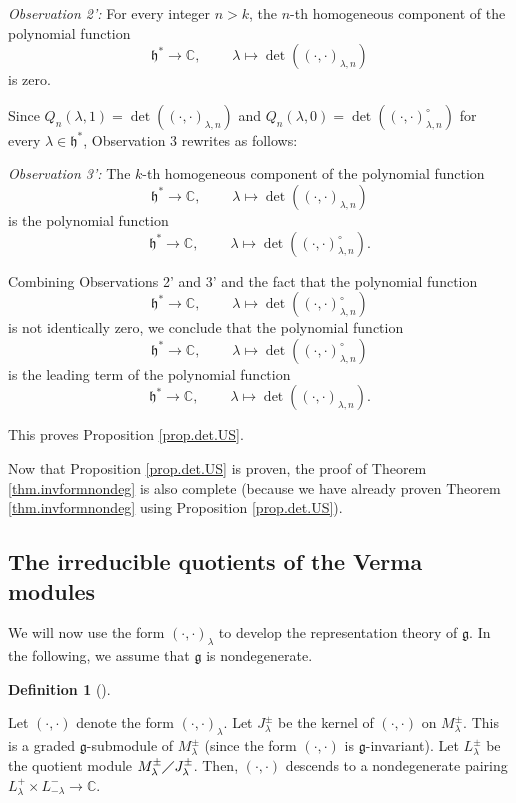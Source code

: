 \documentclass
[numbers=enddot,12pt,final,onecolumn,german,notitlepage]{scrartcl}%
\theoremstyle{definition}
\newtheorem{defi}[theo]{Definition}
\newenvironment{definition}[1][]
{\begin{defi}[#1]\begin{leftbar}}
{\end{leftbar}\end{defi}}
\begin{document}
\textit{Observation 2':} For every integer $n>k$, the $n$-th homogeneous
component of the polynomial function%
\[
\mathfrak{h}^{\ast}\rightarrow\mathbb{C},\ \ \ \ \ \ \ \ \ \ \lambda
\mapsto\det\left(  \left(  \cdot,\cdot\right)  _{\lambda,n}\right)
\]
is zero.

Since $Q_{n}\left(  \lambda,1\right)  =\det\left(  \left(  \cdot,\cdot\right)
_{\lambda,n}\right)  $ and $Q_{n}\left(  \lambda,0\right)  =\det\left(
\left(  \cdot,\cdot\right)  _{\lambda,n}^{\circ}\right)  $ for every
$\lambda\in\mathfrak{h}^{\ast}$, Observation 3 rewrites as follows:

\textit{Observation 3':} The $k$-th homogeneous component of the polynomial
function%
\[
\mathfrak{h}^{\ast}\rightarrow\mathbb{C},\ \ \ \ \ \ \ \ \ \ \lambda
\mapsto\det\left(  \left(  \cdot,\cdot\right)  _{\lambda,n}\right)
\]
is the polynomial function%
\[
\mathfrak{h}^{\ast}\rightarrow\mathbb{C},\ \ \ \ \ \ \ \ \ \ \lambda
\mapsto\det\left(  \left(  \cdot,\cdot\right)  _{\lambda,n}^{\circ}\right)  .
\]


Combining Observations 2' and 3' and the fact that the polynomial function
\[
\mathfrak{h}^{\ast}\rightarrow\mathbb{C},\ \ \ \ \ \ \ \ \ \ \lambda
\mapsto\det\left(  \left(  \cdot,\cdot\right)  _{\lambda,n}^{\circ}\right)
\]
is not identically zero, we conclude that the polynomial function%
\[
\mathfrak{h}^{\ast}\rightarrow\mathbb{C},\ \ \ \ \ \ \ \ \ \ \lambda
\mapsto\det\left(  \left(  \cdot,\cdot\right)  _{\lambda,n}^{\circ}\right)
\]
is the leading term of the polynomial function%
\[
\mathfrak{h}^{\ast}\rightarrow\mathbb{C},\ \ \ \ \ \ \ \ \ \ \lambda
\mapsto\det\left(  \left(  \cdot,\cdot\right)  _{\lambda,n}\right)  .
\]


This proves Proposition \ref{prop.det.US}.

Now that Proposition \ref{prop.det.US} is proven, the proof of Theorem
\ref{thm.invformnondeg} is also complete (because we have already proven
Theorem \ref{thm.invformnondeg} using Proposition \ref{prop.det.US}).

\subsection{The irreducible quotients of the Verma modules}

We will now use the form $\left(  \cdot,\cdot\right)  _{\lambda}$ to develop
the representation theory of $\mathfrak{g}$. In the following, we assume that
$\mathfrak{g}$ is nondegenerate.

\begin{definition}
Let $\left(  \cdot,\cdot\right)  $ denote the form $\left(  \cdot
,\cdot\right)  _{\lambda}$. Let $J_{\lambda}^{\pm}$ be the kernel of $\left(
\cdot,\cdot\right)  $ on $M_{\lambda}^{\pm}$. This is a graded $\mathfrak{g}%
$-submodule of $M_{\lambda}^{\pm}$ (since the form $\left(  \cdot
,\cdot\right)  $ is $\mathfrak{g}$-invariant). Let $L_{\lambda}^{\pm}$ be the
quotient module $M_{\lambda}^{\pm}\diagup J_{\lambda}^{\pm}$. Then, $\left(
\cdot,\cdot\right)  $ descends to a nondegenerate pairing $L_{\lambda}%
^{+}\times L_{-\lambda}^{-}\rightarrow\mathbb{C}$.
\end{definition}
\end{document}
